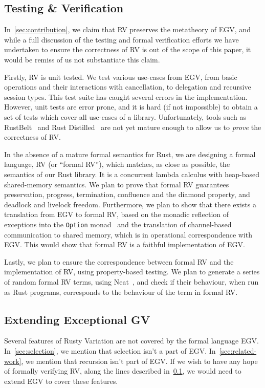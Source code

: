 \documentclass[copyright,creativecommons]{eptcs}
\begin{document}
\subsection{Testing \& Verification}\label{sec:verification}
In~\cref{sec:contribution}, we claim that RV preserves the metatheory of EGV, and while a full discussion of the testing and formal verification efforts we have undertaken to ensure the correctness of RV is out of the scope of this paper, it would be remiss of us not substantiate this claim.

Firstly, RV is unit tested. We test various use-cases from EGV, from basic operations and their interactions with cancellation, to delegation and recursive session types. This test suite has caught several errors in the implementation. However, unit tests are error prone, and it is hard (if not impossible) to obtain a set of tests which cover all use-cases of a library. Unfortunately, tools such as RustBelt~\cite{jung2017} and Rust Distilled~\cite{weiss2018} are not yet mature enough to allow us to \emph{prove} the correctness of RV.

In the absence of a mature formal semantics for Rust, we are designing a formal language, RV (or ``formal RV''), which matches, as close as possible, the semantics of our Rust library. It is a concurrent lambda calculus with heap-based shared-memory semantics. We plan to prove that formal RV guarantees preservation, progress, termination, confluence and the diamond property, and deadlock and livelock freedom. Furthermore, we plan to show that there exists a translation from EGV to formal RV, based on the monadic reflection of exceptions into the \lstinline{Option} monad~\cite{filinski1994} and the translation of channel-based communication to shared memory, which is in operational correspondence with EGV. This would show that formal RV is a faithful implementation of EGV.

Lastly, we plan to ensure the correspondence between formal RV and the implementation of RV, using property-based testing. We plan to generate a series of random formal RV terms, using Neat~\cite{claessen2015}, and check if their behaviour, when run as Rust programs, corresponds to the behaviour of the term in formal RV.

\subsection{Extending Exceptional GV}
Several features of Rusty Variation are not covered by the formal language EGV. In~\cref{sec:selection}, we mention that selection isn't a part of EGV. In~\cref{sec:related-work}, we mention that recursion isn't part of EGV. If we wish to have any hope of formally verifying RV, along the lines described in~\cref{sec:verification}, we would need to extend EGV to cover these features.

\clearpage


\end{document}

